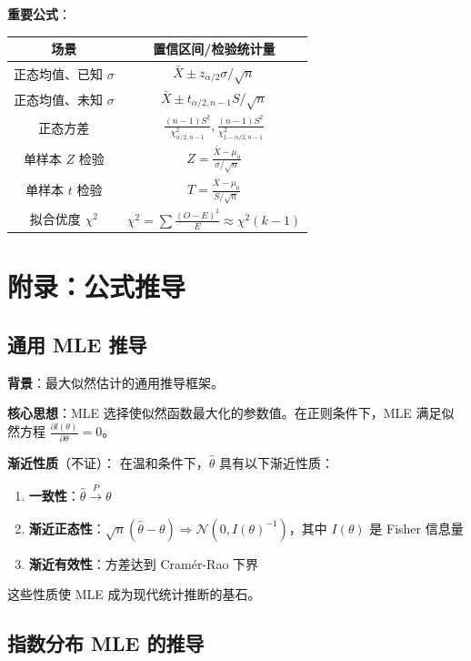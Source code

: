 \textbf{重要公式}：
\begin{center}
\begin{tabular}{|c|c|}
\hline
\textbf{场景} & \textbf{置信区间/检验统计量} \\ \hline
正态均值、已知 $\sigma$ & $\bar{X} \pm z_{\alpha/2}\sigma/\sqrt{n}$ \\ \hline
正态均值、未知 $\sigma$ & $\bar{X} \pm t_{\alpha/2,n-1}S/\sqrt{n}$ \\ \hline
正态方差 & $\frac{(n-1)S^2}{\chi^2_{\alpha/2,n-1}},\frac{(n-1)S^2}{\chi^2_{1-\alpha/2,n-1}}$ \\ \hline
单样本 $Z$ 检验 & $Z = \frac{\bar{X}-\mu_0}{\sigma/\sqrt{n}}$ \\ \hline
单样本 $t$ 检验 & $T = \frac{\bar{X}-\mu_0}{S/\sqrt{n}}$ \\ \hline
拟合优度 $\chi^2$ & $\chi^2 = \sum \frac{(O-E)^2}{E} \approx \chi^2(k-1)$ \\ \hline
\end{tabular}
\end{center}

\section{附录：公式推导}\label{sec:appendix-derivation}

\subsection{通用 MLE 推导}\label{sec:derivation-mle}

\textbf{背景}：最大似然估计的通用推导框架。

\textbf{核心思想}：MLE 选择使似然函数最大化的参数值。在正则条件下，MLE 满足似然方程 $\frac{\partial l(\theta)}{\partial \theta} = 0$。

\textbf{渐近性质}（不证）：
在温和条件下，$\widehat{\theta}$ 具有以下渐近性质：
\begin{enumerate}
\item \textbf{一致性}：$\widehat{\theta} \xrightarrow{P} \theta$
\item \textbf{渐近正态性}：$\sqrt{n}(\widehat{\theta} - \theta) \Rightarrow \mathcal{N}(0, I(\theta)^{-1})$，其中 $I(\theta)$ 是 Fisher 信息量
\item \textbf{渐近有效性}：方差达到 Cram\'er-Rao 下界
\end{enumerate}

这些性质使 MLE 成为现代统计推断的基石。

\subsection{指数分布 MLE 的推导}\label{sec:derivation-exponential-mle}

